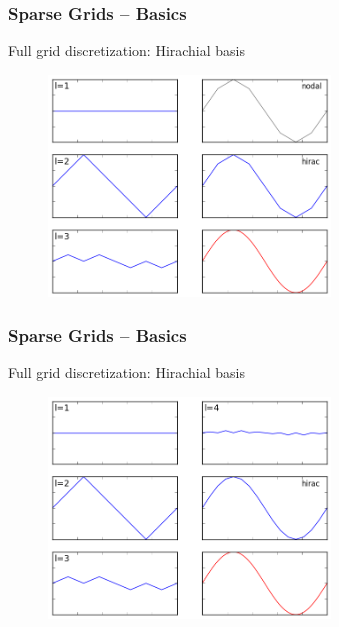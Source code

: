 \begin{frame}
  \frametitle{Sparse Grids -- Basics}
  \topline
  \vspace{-10px}
  \begin{block}{Full grid discretization: Hirachial basis}
    \begin{figure}[!htp]
      \centering
      \includegraphics[width=7.5cm]{images/sparsegrid_1d_1}
      \vspace{-12px}
      \caption{}
    \end{figure}
  \end{block}
\end{frame}


\begin{frame}
  \frametitle{Sparse Grids -- Basics}
  \topline
  \vspace{-10px}
  \begin{block}{Full grid discretization: Hirachial basis}
    \begin{figure}[!htp]
      \centering
      \includegraphics[width=7.5cm]{images/sparsegrid_1d_2}
      \vspace{-12px}
      \caption{}
    \end{figure}
  \end{block}
\end{frame}

